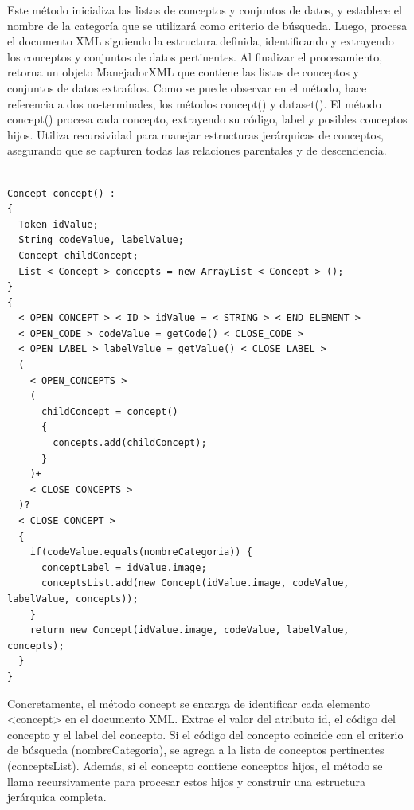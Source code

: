 Este método inicializa las listas de conceptos y conjuntos de datos, y establece el nombre de la categoría que se utilizará como criterio de búsqueda. Luego, procesa el documento XML siguiendo la estructura definida, identificando y extrayendo los conceptos y conjuntos de datos pertinentes. Al finalizar el procesamiento, retorna un objeto ManejadorXML que contiene las listas de conceptos y conjuntos de datos extraídos.
Como se puede observar en el método, hace referencia a dos no-terminales, los métodos concept() y dataset().
El método concept() procesa cada concepto, extrayendo su código, label y posibles conceptos hijos. Utiliza recursividad para manejar estructuras jerárquicas de conceptos, asegurando que se capturen todas las relaciones parentales y de descendencia.

\lstset{inputencoding=utf8/latin1}
\begin{lstlisting}
    
Concept concept() :
{
  Token idValue;
  String codeValue, labelValue;
  Concept childConcept; 
  List < Concept > concepts = new ArrayList < Concept > ();
}
{
  < OPEN_CONCEPT > < ID > idValue = < STRING > < END_ELEMENT > 
  < OPEN_CODE > codeValue = getCode() < CLOSE_CODE > 
  < OPEN_LABEL > labelValue = getValue() < CLOSE_LABEL >
  (
    < OPEN_CONCEPTS >
    (
      childConcept = concept()
      {
        concepts.add(childConcept);
      }
    )+
    < CLOSE_CONCEPTS >
  )?
  < CLOSE_CONCEPT >
  {
    if(codeValue.equals(nombreCategoria)) {
      conceptLabel = idValue.image;
      conceptsList.add(new Concept(idValue.image, codeValue, labelValue, concepts));
	}
	return new Concept(idValue.image, codeValue, labelValue, concepts);
  }
}

\end{lstlisting}

Concretamente, el método concept se encarga de identificar cada elemento <concept> en el documento XML. Extrae el valor del atributo id, el código del concepto y el label del concepto. Si el código del concepto coincide con el criterio de búsqueda (nombreCategoria), se agrega a la lista de conceptos pertinentes (conceptsList). Además, si el concepto contiene conceptos hijos, el método se llama recursivamente para procesar estos hijos y construir una estructura jerárquica completa.

